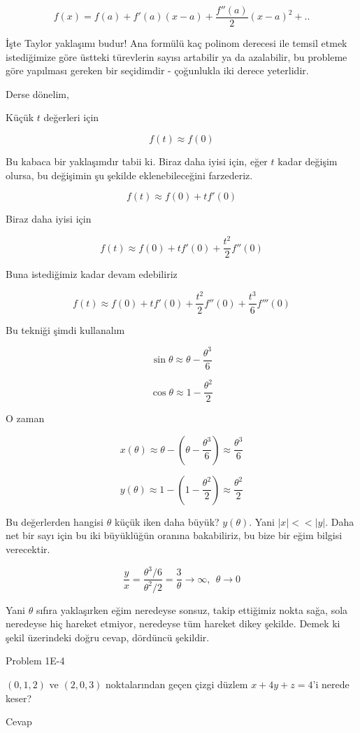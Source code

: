 \documentclass[12pt,fleqn]{article}\usepackage{../../common}
\begin{document}
$$ f(x) = f(a) + f'(a)(x-a) + \frac{f''(a)}{2}(x-a)^2 + .. $$

İşte Taylor yaklaşımı budur! Ana formülü kaç polinom derecesi ile temsil etmek
istediğimize göre üstteki türevlerin sayısı artabilir ya da azalabilir, bu
probleme göre yapılması gereken bir seçidimdir - çoğunlukla iki derece
yeterlidir.

Derse dönelim,

Küçük $t$ değerleri için 

$$ f(t) \approx f(0) $$

Bu kabaca bir yaklaşımdır tabii ki. Biraz daha iyisi için, eğer $t$
kadar değişim olursa, bu değişimin şu şekilde eklenebileceğini farzederiz.

$$ f(t) \approx f(0) + tf'(0)$$

Biraz daha iyisi için

$$ f(t) \approx f(0) + tf'(0) + \frac{t^2}{2}f''(0)$$

Buna istediğimiz kadar devam edebiliriz

$$ f(t) \approx f(0) + tf'(0) + \frac{t^2}{2}f''(0) + \frac{t^3}{6}f'''(0)$$

Bu tekniği şimdi kullanalım

$$ \sin \theta \approx \theta - \frac{\theta^3}{6} $$

$$ \cos \theta \approx 1 - \frac{\theta^2}{2} $$

O zaman

$$ x(\theta) \approx \theta - (\theta  - \frac{\theta^3}{6}) 
\approx \frac{\theta^3}{6} 
$$

$$ y(\theta) \approx 1 - (1  - \frac{\theta^2}{2}) 
\approx \frac{\theta^2}{2} 
$$

Bu değerlerden hangisi $\theta$ küçük iken daha büyük? $y(\theta)$. Yani
$|x| << |y|$. Daha net bir sayı için bu iki büyüklüğün oranına bakabiliriz,
bu bize bir eğim bilgisi verecektir. 

$$ \frac{y}{x} = \frac{\theta^3/6}{\theta^2/2 } = 
\frac{3}{\theta} \to \infty, \ \ \theta \to 0
$$

Yani $\theta$ sıfıra yaklaşırken eğim neredeyse sonsuz, takip ettiğimiz
nokta sağa, sola neredeyse hiç hareket etmiyor, neredeyse tüm hareket dikey
şekilde. Demek ki şekil üzerindeki doğru cevap, dördüncü şekildir. 

Problem 1E-4

$(0,1,2)$ ve $(2,0,3)$ noktalarından geçen çizgi düzlem $x + 4y + z = 4$'i
nerede keser? 

Cevap
\end{document}
